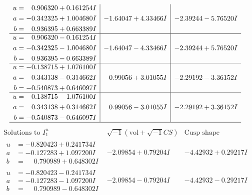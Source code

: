 \documentclass[1p]{elsarticle_modified}
\theoremstyle{definition}
\newcommand{\I}{\sqrt{-1}}
\begin{document}
$$\begin{array}{c|c|c}
\begin{aligned}
u &= \phantom{-}0.906320 + 0.161254 I \\
a &= -0.342325 + 1.004680 I \\
b &= \phantom{-}0.936395 + 0.663389 I\end{aligned}
 & -1.64047 + 4.33466 I & -2.39244 - 5.76520 I \\ \hline\begin{aligned}
u &= \phantom{-}0.906320 - 0.161254 I \\
a &= -0.342325 - 1.004680 I \\
b &= \phantom{-}0.936395 - 0.663389 I\end{aligned}
 & -1.64047 - 4.33466 I & -2.39244 + 5.76520 I \\ \hline\begin{aligned}
u &= -0.138715 + 1.076100 I \\
a &= \phantom{-}0.343138 - 0.314662 I \\
b &= -0.540873 + 0.646097 I\end{aligned}
 & \phantom{-}0.99056 + 3.01055 I & -2.29192 - 3.36152 I \\ \hline\begin{aligned}
u &= -0.138715 - 1.076100 I \\
a &= \phantom{-}0.343138 + 0.314662 I \\
b &= -0.540873 - 0.646097 I\end{aligned}
 & \phantom{-}0.99056 - 3.01055 I & -2.29192 + 3.36152 I\\
 \hline 
 \end{array}$$\newpage$$\begin{array}{c|c|c}  
\text{Solutions to }I^u_{1}& \I (\text{vol} + \sqrt{-1}CS) & \text{Cusp shape}\\
 \hline 
\begin{aligned}
u &= -0.820423 + 0.241734 I \\
a &= -0.127283 + 1.097200 I \\
b &= \phantom{-}0.790989 + 0.648302 I\end{aligned}
 & -2.09854 + 0.79204 I & -4.42932 + 0.29217 I \\ \hline\begin{aligned}
u &= -0.820423 - 0.241734 I \\
a &= -0.127283 - 1.097200 I \\
b &= \phantom{-}0.790989 - 0.648302 I\end{aligned}
 & -2.09854 - 0.79204 I & -4.42932 - 0.29217 I \\ \hline\begin{aligned}

\end{aligned}
\end{array}$$
\end{document}
